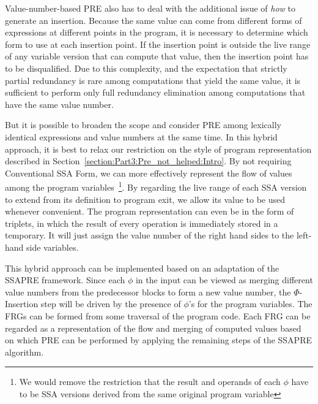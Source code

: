 Value-number-based PRE also has to deal with the additional issue of \emph{how} to generate an insertion. 
Because the same value can come from different forms of expressions at different points in the program, it is necessary to determine which form to use at each insertion point. 
If the insertion point is outside the live range of any variable version that can compute that value, then the insertion point has to be disqualified. 
Due to this complexity, and the expectation that strictly partial redundancy is rare among computations that yield the same value, it is sufficient to perform only full redundancy elimination among computations that have the same value number.

But it is possible to broaden the scope and consider PRE among lexically identical expressions and value numbers at the same time. 
In this hybrid approach, it is best to relax our restriction on the style of program representation described in Section~\ref{section:Part3:Pre_not_helped:Intro}. 
By not requiring Conventional SSA Form, we can more effectively represent the flow of values among the program variables~\footnote{We would remove the restriction that the result and operands of each $\phi$ have to be SSA versions derived from the same original program variable}. 
By regarding the live range of each SSA version to extend from its definition to program exit, we allow its value to be used whenever convenient. 
The program representation can even be in the form of triplets, in which the result of every operation is immediately stored in a temporary. 
It will just assign the value number of the right hand sides to the left-hand side variables.

This hybrid approach can be implemented based on an adaptation of the SSAPRE framework. 
Since each $\phi$ in the input can be viewed as merging different value numbers from the predecessor blocks to form a new value number, the $\Phi$-Insertion step will be driven by the presence of $\phi$'s for the program variables. 
The FRGs can be formed from some traversal of the program code. 
Each FRG can be regarded as a representation of the flow and merging of computed values based on which PRE can be performed by applying the remaining steps of the SSAPRE algorithm.

